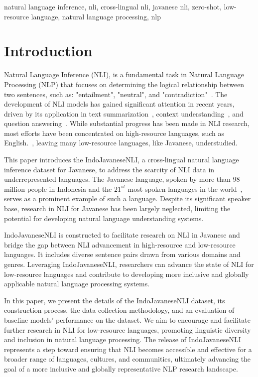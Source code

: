 \documentclass[a4paper, conference]{IEEEtran}
\begin{document}
\begin{IEEEkeywords}
natural language inference, nli, cross-lingual nli, javanese nli, zero-shot, low-resource language, natural language processing, nlp
\end{IEEEkeywords}

\section{Introduction}
Natural Language Inference (NLI), is a fundamental task in Natural Language Processing (NLP) that focuses on determining the logical relationship between two sentences, such as: "entailment", "neutral", and "contradiction"~\cite{Dagan2006}. The development of NLI models has gained significant attention in recent years, driven by its application in text summarization~\cite{Falke2019, Krysci2020}, context understanding~\cite{Parikh2016}, and question answering~\cite{Welleck20019}. While substantial progress has been made in NLI research, most efforts have been concentrated on high-resource languages, such as English.~\cite{Hedderich2021}, leaving many low-resource languages, like Javanese, understudied.

This paper introduces the IndoJavaneseNLI, a cross-lingual natural language inference dataset for Javanese, to address the scarcity of NLI data in underrepresented languages. The Javanese language, spoken by more than 98 million people in Indonesia and the $21^{st}$ most spoken languages in the world~\cite{Eberhard2023}, serves as a prominent example of such a language. Despite its significant speaker base, research in NLI for Javanese has been largely neglected, limiting the potential for developing natural language understanding systems.

IndoJavaneseNLI is constructed to facilitate research on NLI in Javanese and bridge the gap between NLI advancement in high-resource and low-resource languages. It includes diverse sentence pairs drawn from various domains and genres. Leveraging IndoJavaneseNLI, researchers can advance the state of NLI for low-resource languages and contribute to developing more inclusive and globally applicable natural language processing systems.

In this paper, we present the details of the IndoJavaneseNLI dataset, its construction process, the data collection methodology, and an evaluation of baseline models' performance on the dataset. We aim to encourage and facilitate further research in NLI for low-resource languages, promoting linguistic diversity and inclusion in natural language processing. The release of IndoJavaneseNLI represents a step toward ensuring that NLI becomes accessible and effective for a broader range of languages, cultures, and communities, ultimately advancing the goal of a more inclusive and globally representative NLP research landscape.
\end{document}
